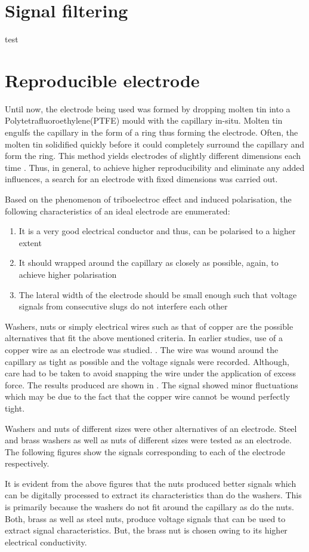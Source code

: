 \documentclass[main.tex]{subfiles}
\begin{document}
\section[Signal filtering]{Signal filtering}
test
\section[Reproducible electrode]{Reproducible electrode}
Until now, the electrode being used was formed by dropping molten tin into a Polytetrafluoroethylene(PTFE) mould with the capillary in-situ.  Molten tin engulfs the capillary in the form of a ring thus forming the electrode. Often, the molten tin solidified quickly before it could completely surround the capillary and form the ring. This method yields electrodes of slightly different dimensions each time . Thus, in general, to achieve higher reproducibility and eliminate any added influences, a search for an electrode with fixed dimensions was carried out. 

Based on the phenomenon of triboelectroc effect and induced polarisation, the following characteristics of an ideal electrode are enumerated:
\begin{enumerate}
	\item It is a very good electrical conductor and thus, can be polarised to a higher extent
	\item It should wrapped around the capillary as closely as possible, again, to achieve higher polarisation
	\item The lateral width of the electrode should be small enough such that voltage signals from consecutive slugs do not interfere each other
\end{enumerate}

Washers, nuts or simply electrical wires such as that of copper are the possible alternatives that fit the above mentioned criteria. 
In earlier studies, use of a copper wire as an electrode was studied. . The wire was wound around the capillary as tight as possible and the voltage signals were recorded. Although, care had to be taken to avoid snapping the wire under the application of excess force. The results produced are shown in . The signal showed minor fluctuations which may be due to the fact that the copper wire cannot be wound perfectly tight. 

Washers and nuts of different sizes were other alternatives of an electrode. Steel and brass washers as well as nuts of different sizes were tested as an electrode. The following figures show the signals corresponding to each of the electrode respectively. 

It is evident from the above figures that the nuts produced better signals which can be digitally processed to extract its characteristics than do the washers. This is primarily because the washers do not fit around the capillary as do the nuts. Both, brass as well as steel nuts, produce voltage signals that can be used to extract signal characteristics. But, the brass nut is chosen owing to its higher electrical conductivity. 
\end{document}
